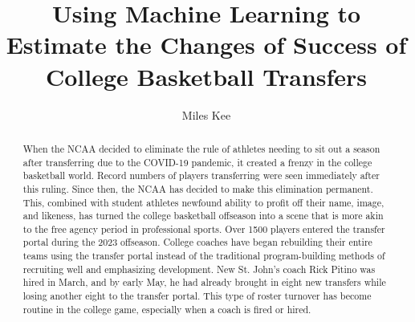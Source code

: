 \documentclass[12pt]{article}
\title{Using Machine Learning to Estimate the Changes of Success of College Basketball Transfers}
\author{Miles Kee}
\begin{document}
\maketitle

\begin{abstract}
When the NCAA decided to eliminate the rule of athletes needing to sit out a season after transferring due to the COVID-19 pandemic, it created a frenzy in the college basketball world. Record numbers of players transferring were seen immediately after this ruling. Since then, the NCAA has decided to make this elimination permanent. This, combined with student athletes newfound ability to profit off their name, image, and likeness, has turned the college basketball offseason into a scene that is more akin to the free agency period in professional sports. Over 1500 players entered the transfer portal during the 2023 offseason. College coaches have began rebuilding their entire teams using the transfer portal instead of the traditional program-building methods of recruiting well and emphasizing development. New St. John's coach Rick Pitino was hired in March, and by early May, he had already brought in eight new transfers while losing another eight to the transfer portal. This type of roster turnover has become routine in the college game, especially when a coach is fired or hired. 
\end{abstract}
\end{document}
